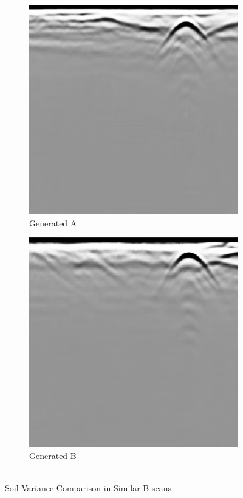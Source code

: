 \begin{figure}[H]
    \centering
    \begin{subfigure}[b]{0.4\linewidth}
    \includegraphics[width=\linewidth]{figures/high_res_gen.png}
    \caption{Generated A}
  \end{subfigure}
  \begin{subfigure}[b]{0.4\linewidth}
    \includegraphics[width=\linewidth]{figures/high_res_gan_comparison.png}
    \caption{Generated B}
  \end{subfigure}
  \caption{\\Soil Variance Comparison in Similar B-scans}
  \label{fig:hi_res_compare}
\end{figure}

